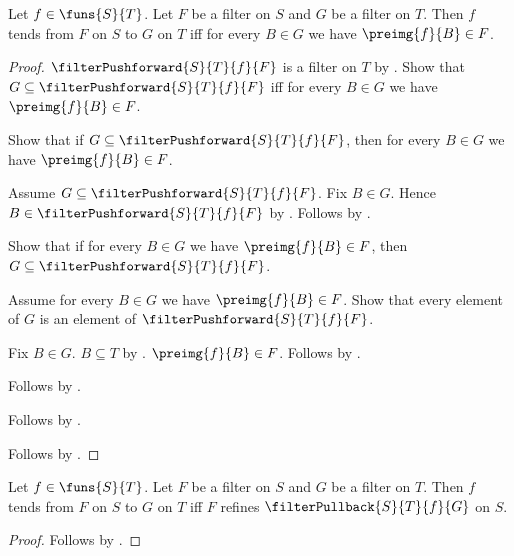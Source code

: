 \begin{theorem}\label{filter_tendsto_iff_preimage}
    Let $f\in\funs{S}{T}$.
    Let $F$ be a filter on $S$ and $G$ be a filter on $T$.
    Then $f$ tends from $F$ on $S$ to $G$ on $T$ iff
        for every $B\in G$ we have $\preimg{f}{B}\in F$.
\end{theorem}
\begin{proof}
    $\filterPushforward{S}{T}{f}{F}$ is a filter on $T$ by
        .
    Show that $G\subseteq\filterPushforward{S}{T}{f}{F}$ iff
        for every $B\in G$ we have $\preimg{f}{B}\in F$.
    \begin{subproof}
        Show that if $G\subseteq\filterPushforward{S}{T}{f}{F}$, then
            for every $B\in G$ we have $\preimg{f}{B}\in F$.
        \begin{subproof}
            Assume $G\subseteq\filterPushforward{S}{T}{f}{F}$.
            Fix $B\in G$.
            Hence $B\in\filterPushforward{S}{T}{f}{F}$ by .
            Follows by .
        \end{subproof}
        Show that if for every $B\in G$ we have $\preimg{f}{B}\in F$,
            then $G\subseteq\filterPushforward{S}{T}{f}{F}$.
        \begin{subproof}
            Assume for every $B\in G$ we have $\preimg{f}{B}\in F$.
            Show that every element of $G$ is an element of
                $\filterPushforward{S}{T}{f}{F}$.
            \begin{subproof}
                Fix $B\in G$.
                $B\subseteq T$ by .
                $\preimg{f}{B}\in F$.
                Follows by .
            \end{subproof}
            Follows by .
        \end{subproof}
        Follows by \auto.
    \end{subproof}
    Follows by .
\end{proof}

\begin{theorem}\label{filter_tendsto_iff_pullback}
    Let $f\in\funs{S}{T}$.
    Let $F$ be a filter on $S$ and $G$ be a filter on $T$.
    Then $f$ tends from $F$ on $S$ to $G$ on $T$ iff
        $F$ refines $\filterPullback{S}{T}{f}{G}$ on $S$.
\end{theorem}
\begin{proof}
    Follows by
        .
\end{proof}

